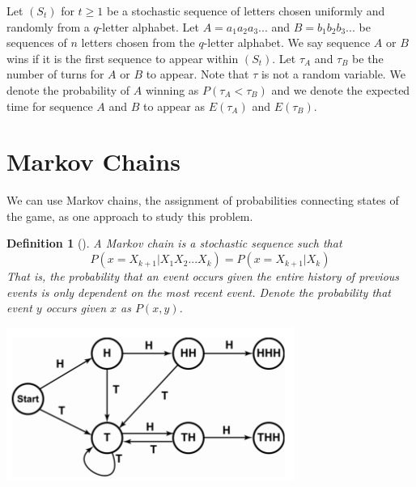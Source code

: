 \documentclass[12pt,haverford,landscape]{haverposter}
\newtheorem{definition}[theorem]{Definition}
\begin{document}
\begin{multicols}{4}
\Large Let $(S_t)$ for $t \geq 1$ be a stochastic sequence of letters chosen uniformly and
randomly from a $q$-letter alphabet. Let $A=a_1a_2a_3...$ and $B=b_1b_2b_3...$ be sequences
of $n$ letters chosen from the $q$-letter alphabet. We say
sequence $A$ or $B$ wins if it is the first sequence to appear within $(S_t)$. Let $\tau_A$ and $\tau_B$ be
the number of turns for $A$ or $B$ to appear. Note that $\tau$ is not a random variable. We denote
the probability of $A$ winning as $P(\tau_A < \tau_B)$ and we denote the expected time for sequence
$A$ and $B$ to appear as $E(\tau_A)$ and $E(\tau_B)$.


\color{Black} %

\section{\LARGE Markov Chains}

We can use Markov chains, the assignment of probabilities connecting states of the game,
as one approach to study this problem.

\begin{definition}[\cite{textbook}]
	A Markov chain is a stochastic sequence such that
	$$P(x = X_{k+1} | X_1X_2...X_k) = P(x = X_{k+1} | X_k)$$
	That is, the probability that an event occurs given the entire history of
	previous events is only dependent on the most recent event. Denote the probability
	that event $y$ occurs given $x$ as $P(x,y)$.
\end{definition}

\begin{center}
\includegraphics[width=0.6\linewidth]{RaceBetweenHHHandTHH.png}
\end{center}


\end{multicols}
\end{document}
